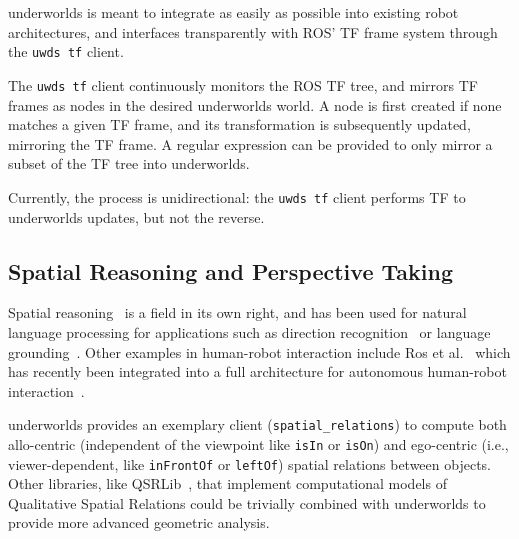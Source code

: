 \documentclass[letterpaper, 10pt, conference]{ieeeconf}
\newcommand{\etal}{et al.\xspace}
\newcommand{\ie}{i.e.,\xspace}
\newcommand{\uwds}{{\sc underworlds}\xspace}
\begin{document}
\uwds is meant to integrate as easily as possible into existing robot
architectures, and interfaces transparently with ROS' TF frame system through
the {\tt uwds tf} client.

The {\tt uwds tf} client continuously monitors the ROS TF tree, and mirrors
TF frames as nodes in the desired \uwds world. A node is first created if none
matches a given TF frame, and its transformation is subsequently updated,
mirroring the TF frame. A regular expression can be provided to only mirror a
subset of the TF tree into \uwds.

Currently, the process is unidirectional: the {\tt uwds tf} client performs TF
to \uwds updates, but not the reverse.

\subsection{Spatial Reasoning and Perspective Taking}
\label{spatial}

Spatial reasoning~\cite{O'Keefe1999} is a field in its own right, and has been
used for natural language processing for applications such as direction
recognition~\cite{Kollar2010,Matuszek2010} or language
grounding~\cite{Tellex2010}. Other examples in human-robot interaction include Ros
\etal~\cite{ros2010solving, ros2010which} which has recently been integrated
into a full architecture for autonomous human-robot
interaction~\cite{lemaignan2016artificial}.


\uwds provides an exemplary client ({\tt spatial\_relations}) to compute both
allo-centric (independent of the viewpoint like {\tt isIn} or {\tt isOn}) and
ego-centric (\ie viewer-dependent, like {\tt inFrontOf} or {\tt leftOf}) spatial relations
between objects.
Other libraries, like QSRLib~\cite{gatsoulis2016qsrlib}, that implement
computational models of Qualitative Spatial Relations could be trivially
combined with \uwds to provide more advanced geometric analysis.
\end{document}
